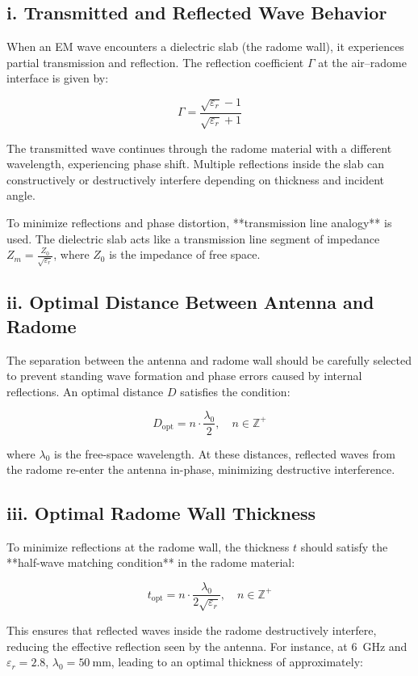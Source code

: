 \subsection*{i. Transmitted and Reflected Wave Behavior}

When an EM wave encounters a dielectric slab (the radome wall), it experiences partial transmission and reflection. The reflection coefficient $\Gamma$ at the air–radome interface is given by:

\[
\Gamma = \frac{\sqrt{\varepsilon_r} - 1}{\sqrt{\varepsilon_r} + 1}
\]

The transmitted wave continues through the radome material with a different wavelength, experiencing phase shift. Multiple reflections inside the slab can constructively or destructively interfere depending on thickness and incident angle.

To minimize reflections and phase distortion, **transmission line analogy** is used. The dielectric slab acts like a transmission line segment of impedance $Z_m = \frac{Z_0}{\sqrt{\varepsilon_r}}$, where $Z_0$ is the impedance of free space.

\subsection*{ii. Optimal Distance Between Antenna and Radome}

The separation between the antenna and radome wall should be carefully selected to prevent standing wave formation and phase errors caused by internal reflections. An optimal distance $D$ satisfies the condition:

\[
D_{\text{opt}} = n \cdot \frac{\lambda_0}{2}, \quad n \in \mathbb{Z}^+
\]

where $\lambda_0$ is the free-space wavelength. At these distances, reflected waves from the radome re-enter the antenna in-phase, minimizing destructive interference.

\subsection*{iii. Optimal Radome Wall Thickness}

To minimize reflections at the radome wall, the thickness $t$ should satisfy the **half-wave matching condition** in the radome material:

\[
t_{\text{opt}} = n \cdot \frac{\lambda_0}{2\sqrt{\varepsilon_r}}, \quad n \in \mathbb{Z}^+
\]

This ensures that reflected waves inside the radome destructively interfere, reducing the effective reflection seen by the antenna. For instance, at 6~GHz and $\varepsilon_r = 2.8$, $\lambda_0 = 50~\mathrm{mm}$, leading to an optimal thickness of approximately:

